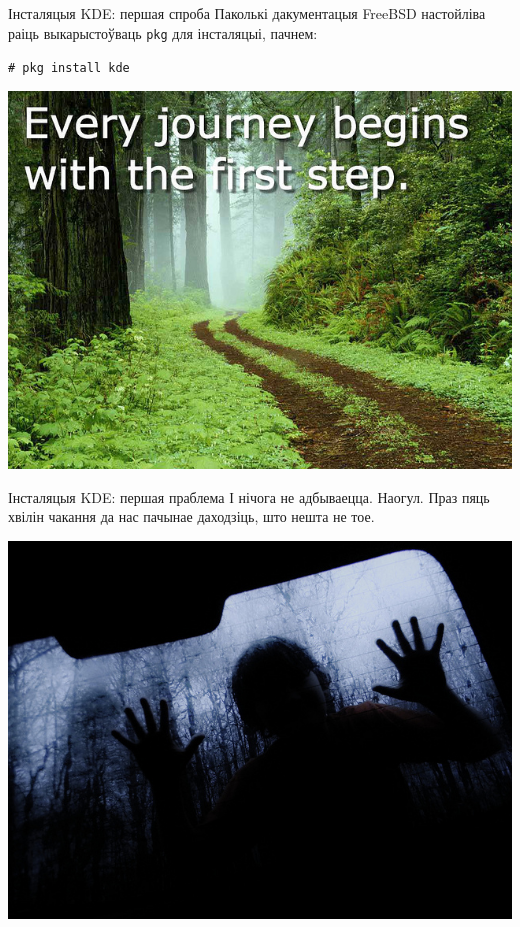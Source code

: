 \documentclass[ignorenonframetext,hyperref={pdftex,unicode}]{beamer}
\newcommand{\shellcmd}[1]{
\indent\indent\indent\texttt{\footnotesize\# #1}
}
\begin{document}
\begin{frame}{Інсталяцыя KDE: першая спроба} %
	Паколькі дакументацыя FreeBSD настойліва раіць выкарыстоўваць \texttt{pkg} для інсталяцыі, пачнем:

	\shellcmd{pkg install kde}
	\begin{center}
 		\includegraphics[height=0.7\textheight,keepaspectratio]{2656648042_0ced853512_z} %
	\end{center}
\end{frame} %

\begin{frame}{Інсталяцыя KDE: першая праблема} %
	І нічога не адбываецца. Наогул. Праз пяць хвілін чакання да нас пачынае даходзіць, што нешта не тое.
	\begin{center}
 		\includegraphics[height=0.7\textheight,keepaspectratio]{6428406857_0f97c985fd_z} %
	\end{center}
\end{frame} %
\end{document}
